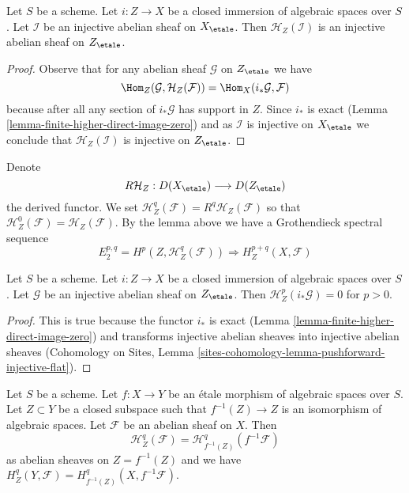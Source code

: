 \begin{lemma}
\label{lemma-sections-with-support-acyclic}
Let $S$ be a scheme.
Let $i : Z \to X$ be a closed immersion of algebraic spaces over $S$.
Let $\mathcal{I}$ be an injective abelian sheaf on $X_\etale$.
Then $\mathcal{H}_Z(\mathcal{I})$ is an injective abelian sheaf
on $Z_\etale$.
\end{lemma}

\begin{proof}
Observe that for any abelian sheaf $\mathcal{G}$ on $Z_\etale$
we have
$$
\Hom_Z(\mathcal{G}, \mathcal{H}_Z(\mathcal{F})) =
\Hom_X(i_*\mathcal{G}, \mathcal{F})
$$
because after all any section of $i_*\mathcal{G}$ has support in $Z$.
Since $i_*$ is exact (Lemma \ref{lemma-finite-higher-direct-image-zero})
and as $\mathcal{I}$ is injective on $X_\etale$ we conclude that
$\mathcal{H}_Z(\mathcal{I})$ is injective on $Z_\etale$.
\end{proof}

\noindent
Denote
$$
R\mathcal{H}_Z : D(X_\etale) \longrightarrow D(Z_\etale)
$$
the derived functor. We set
$\mathcal{H}^q_Z(\mathcal{F}) = R^q\mathcal{H}_Z(\mathcal{F})$ so that
$\mathcal{H}^0_Z(\mathcal{F}) = \mathcal{H}_Z(\mathcal{F})$.
By the lemma above we have a Grothendieck spectral sequence
$$
E_2^{p, q} = H^p(Z, \mathcal{H}^q_Z(\mathcal{F}))
\Rightarrow H^{p + q}_Z(X, \mathcal{F})
$$

\begin{lemma}
\label{lemma-cohomology-with-support-sheaf-on-support}
Let $S$ be a scheme. Let $i : Z \to X$ be a closed immersion of
algebraic spaces over $S$. Let $\mathcal{G}$ be an injective abelian
sheaf on $Z_\etale$. Then $\mathcal{H}^p_Z(i_*\mathcal{G}) = 0$ for $p > 0$.
\end{lemma}

\begin{proof}
This is true because the functor $i_*$ is exact
(Lemma \ref{lemma-finite-higher-direct-image-zero}) and transforms
injective abelian sheaves into injective abelian sheaves
(Cohomology on Sites, Lemma
\ref{sites-cohomology-lemma-pushforward-injective-flat}).
\end{proof}

\begin{lemma}
\label{lemma-etale-localization-sheaf-with-support}
Let $S$ be a scheme. Let $f : X \to Y$ be an \'etale morphism of
algebraic spaces over $S$. Let $Z \subset Y$ be a closed subspace
such that $f^{-1}(Z) \to Z$ is an isomorphism of algebraic spaces.
Let $\mathcal{F}$ be an abelian sheaf on $X$. Then
$$
\mathcal{H}^q_Z(\mathcal{F}) = \mathcal{H}^q_{f^{-1}(Z)}(f^{-1}\mathcal{F})
$$
as abelian sheaves on $Z = f^{-1}(Z)$ and we
have $H^q_Z(Y, \mathcal{F}) = H^q_{f^{-1}(Z)}(X, f^{-1}\mathcal{F})$.
\end{lemma}

